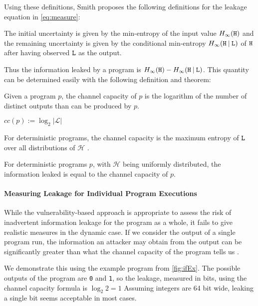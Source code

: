 Using these definitions, Smith \cite{smith09} proposes the following definitions for the leakage equation in \ref{eq:measure}:

The initial uncertainty is given by the min-entropy of the input value $H_\infty(\mathtt{H})$ and the remaining uncertainty is given by the conditional min-entropy $H_\infty(\mathtt{H} \: | \: \mathtt{L})$ of $\mathtt{H}$ after having observed $\mathtt{L}$ as the output.

Thus the information leaked by a program is $H_\infty(\mathtt{H}) - H_\infty(\mathtt{H} \: | \: \mathtt{L})$. This quantity can be determined easily with the following definition and theorem:

\begin{definition}
    Given a program $p$, the channel capacity of $p$ is the logarithm of the number of distinct outputs than can be produced by $p$.
    \begin{center}
        $cc(p) := \log_2 |\mathcal{L}|$
    \end{center}
    For deterministic programs, the channel capacity is the maximum entropy of $\mathtt{L}$ over all distributions of $\mathcal{H}$ \cite{smith09}.
\end{definition}

\begin{theorem}
    For deterministic programs $p$, with $\mathcal{H}$ being uniformly distributed, the information leaked is equal to the channel capacity of $p$.
\end{theorem}

\paragraph{Measuring Leakage for Individual Program Executions}
While the vulnerability-based approach is appropriate to assess the risk of inadvertent information leakage for the program as a whole, it fails to give realistic measures in the dynamic case. If we consider the output of a single program run, the information an attacker may obtain from the output can be significantly greater than what the channel capacity of the program tells us  \cite{bielova16}.

We demonstrate this using the example program from \ref{fig:ifEx}. The possible outputs of the program are \texttt{0} and \texttt{1}, so the leakage, measured in bits, using the channel capacity formula is $\log_2 2 = 1$ Assuming integers are 64 bit wide, leaking a single bit seems acceptable in most cases.

